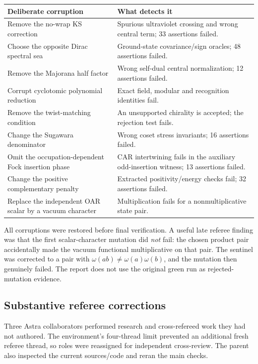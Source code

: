 \begin{longtable}{@{}p{}p{}@{}}
\toprule
Deliberate corruption & What detects it\\\midrule
Remove the no-wrap KS correction & Spurious ultraviolet crossing and wrong
central term; 33 assertions failed.\\
Choose the opposite Dirac spectral sea & Ground-state covariance/sign
oracles; 48 assertions failed.\\
Remove the Majorana half factor & Wrong self-dual central normalization;
12 assertions failed.\\
Corrupt cyclotomic polynomial reduction & Exact field, modular and
recognition identities fail.\\
Remove the twist-matching condition & An unsupported chirality is accepted;
the rejection test fails.\\
Change the Sugawara denominator & Wrong coset stress invariants;
16 assertions failed.\\
Omit the occupation-dependent Fock insertion phase & CAR intertwining
fails in the auxiliary odd-insertion witness; 13 assertions failed.\\
Change the positive complementary penalty & Extracted positivity/energy
checks fail; 32 assertions failed.\\
Replace the independent OAR scalar by a vacuum character & Multiplication
fails for a nonmultiplicative state pair.\\
\bottomrule
\end{longtable}

All corruptions were restored before final verification. A useful late
referee finding was that the first scalar-character mutation did \emph{not}
fail: the chosen product pair accidentally made the vacuum functional
multiplicative on that pair. The sentinel was corrected to a pair with
$\omega(ab)\ne\omega(a)\omega(b)$, and the mutation then genuinely failed.
The report does not use the original green run as rejected-mutation evidence.

\subsection{Substantive referee corrections}

Three Astra collaborators performed research and cross-refereed work they
had not authored. The environment's four-thread limit prevented an additional
fresh referee thread, so roles were reassigned for independent cross-review.
The parent also inspected the current sources/code and reran the main checks.

